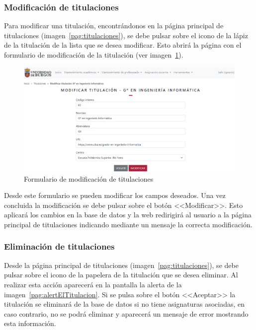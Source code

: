 \subsubsection{Modificación de titulaciones}
Para modificar una titulación, encontrándonos en la página principal de titulaciones (imagen~\ref{pag:titulaciones}), se debe pulsar sobre el icono de la lápiz de la titulación de la lista que se desea modificar.
Esto abrirá la página con el formulario de modificación de la titulación (ver imagen~\ref{pag:formModTitulacion}).

\begin{figure}
	\centering
	\includegraphics[width=\textwidth]{../img/Anexos/Manual usuario/formModTitulacion.png}
	\caption{Formulario de modificación de titulaciones}\label{pag:formModTitulacion}
\end{figure}

Desde este formulario se pueden modificar los campos deseados.
Una vez concluida la modificación se debe pulsar sobre el botón <<Modificar>>.
Esto aplicará los cambios en la base de datos y la web redirigirá al usuario a la página principal de titulaciones indicando mediante un mensaje la correcta modificación.

\subsubsection{Eliminación de titulaciones}
Desde la página principal de titulaciones (imagen~\ref{pag:titulaciones}), se debe pulsar sobre el icono de la papelera de la titulación que se desea eliminar.
Al realizar esta acción aparecerá en la pantalla la alerta de la imagen~\ref{pag:alertElTitulacion}. Si se pulsa sobre el botón <<Aceptar>> la titulación se eliminará de la base de datos si no tiene asignaturas asociadas, en caso contrario, no se podrá eliminar y aparecerá un mensaje de error mostrando esta información.

